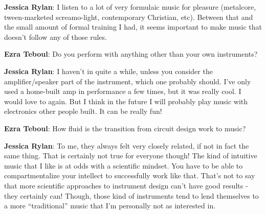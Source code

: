 \textbf{Jessica Rylan}: I listen to a lot of very formulaic music for pleasure (metalcore, tween-marketed screamo-light, contemporary Christian, etc). Between that and the small amount of formal training I had, it seems important to make music that doesn't follow any of those rules.

\textbf{Ezra Teboul}: Do you perform with anything other than your own instruments? 
                  
\textbf{Jessica Rylan}: I haven't in quite a while, unless you consider the amplifier/speaker part of the instrument, which one probably should. I've only used a home-built amp in performance a few times, but it was really cool. I would love to again. But I think in the future I will probably play music with electronics other people built. It can be really fun!

\textbf{Ezra Teboul}: How fluid is the transition from circuit design work to music?  

\textbf{Jessica Rylan}: To me, they always felt very closely related, if not in fact the same thing. That is certainly not true for everyone though! The kind of intuitive music that I like is at odds with a scientific mindset. You have to be able to compartmentalize your intellect to successfully work like that. That's not to say that more scientific approaches to instrument design can't have good results - they certainly can! Though, those kind of instruments tend to lend themselves to a more ``traditional'' music that I'm personally not as interested in.

\newpage
\clearpage 